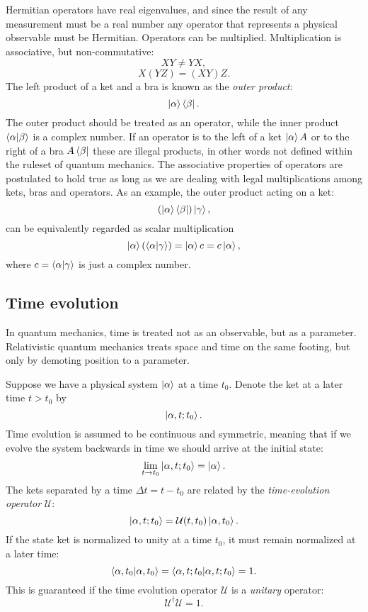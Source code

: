 Hermitian operators have real eigenvalues, and since the result
of any measurement must be a real number any operator that
represents a physical observable must be Hermitian.
\newline
Operators can be multiplied. Multiplication is associative, but non-commutative:
$$ XY \neq YX ,$$
$$ X(YZ) = (XY)Z .$$
The left product of a ket and a bra is known as the \textit{outer product}:
$$ \ket{\alpha} \bra{\beta} .$$
The outer product should be treated as an operator, while the inner product
$\braket{\alpha | \beta}$ is a complex number.
If an operator is to the left of a ket $\ket{\alpha} A$ or to the right
of a bra $A \bra{\beta}$ these are illegal products, in other words
not defined within the ruleset of quantum mechanics.
The associative properties of operators are postulated to hold true
as long as we are dealing with legal multiplications among kets, bras
and operators. As an example, the outer product acting on a ket:
$$ (\ket{\alpha} \bra{\beta}) \ket{\gamma} ,$$
can be equivalently regarded as scalar multiplication
$$ \ket{\alpha} (\braket{\alpha | \gamma})
    = \ket{\alpha} c = c \ket{\alpha} ,$$
where $c = \braket{\alpha | \gamma}$ is just a complex number.

\subsection{Time evolution}
In quantum mechanics, time is treated not as an observable,
but as a parameter. Relativistic quantum mechanics
treats space and time on the same footing, but only by demoting
position to a parameter.
\par
Suppose we have a physical system $\ket{\alpha}$
at a time $t_0$. Denote the ket at a later time $t > t_0$ by
$$ \ket{\alpha, t; t_0} .$$
Time evolution is assumed to be continuous and symmetric,
meaning that if we evolve the system backwards in time
we should arrive at the initial state:
$$ \lim_{t \rightarrow t_0} \ket{\alpha, t; t_0}
= \ket{\alpha} .$$
The kets separated by a time $\Delta t = t - t_0$
are related by the \textit{time-evolution operator} $\mathcal{U}$:
$$ \ket{\alpha, t; t_0} = \mathcal{U}(t, t_0) \ket{\alpha, t_0} .$$
If the state ket is normalized to unity at a time $t_0$,
it must remain normalized at a later time:
$$ \braket{\alpha, t_0 | \alpha, t_0} = \braket{\alpha, t; t_0
    | \alpha, t; t_0} = 1 .$$
This is guaranteed if the time evolution operator 
$\mathcal{U}$ is a \textit{unitary} operator:
$$ \mathcal{U}^{\dagger} \mathcal{U} = 1 .$$

